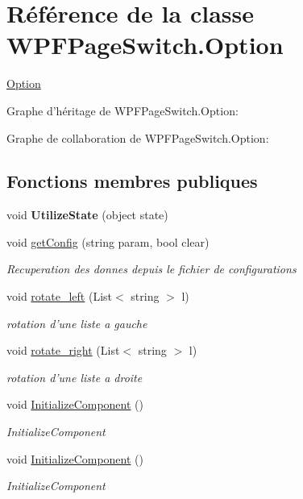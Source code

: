 \hypertarget{class_w_p_f_page_switch_1_1_option}{\section{Référence de la classe W\+P\+F\+Page\+Switch.\+Option}
\label{class_w_p_f_page_switch_1_1_option}
}


\hyperlink{class_w_p_f_page_switch_1_1_option}{Option}  




Graphe d'héritage de W\+P\+F\+Page\+Switch.\+Option\+:


Graphe de collaboration de W\+P\+F\+Page\+Switch.\+Option\+:
\subsection*{Fonctions membres publiques}
\begin{DoxyCompactItemize}
\item 
\hypertarget{class_w_p_f_page_switch_1_1_option_a376be63c0c1be45ecf6a73ea54872524}{void {\bfseries Utilize\+State} (object state)}\label{class_w_p_f_page_switch_1_1_option_a376be63c0c1be45ecf6a73ea54872524}

\item 
void \hyperlink{class_w_p_f_page_switch_1_1_option_ab61070b3c563a16e29550e1ba0d5046b}{get\+Config} (string param, bool clear)
\begin{DoxyCompactList}\small\item\em Recuperation des donnes depuis le fichier de configurations \end{DoxyCompactList}\item 
void \hyperlink{class_w_p_f_page_switch_1_1_option_ab9931ed6a02b7dc83bcd4c7a368e6d07}{rotate\+\_\+left} (List$<$ string $>$ l)
\begin{DoxyCompactList}\small\item\em rotation d'une liste a gauche \end{DoxyCompactList}\item 
void \hyperlink{class_w_p_f_page_switch_1_1_option_a696d785be49fa21a97385cbd884b4bc9}{rotate\+\_\+right} (List$<$ string $>$ l)
\begin{DoxyCompactList}\small\item\em rotation d'une liste a droite \end{DoxyCompactList}\item 
void \hyperlink{class_w_p_f_page_switch_1_1_option_a317fd55293bd6bbd222ccdfbc9e2812f}{Initialize\+Component} ()
\begin{DoxyCompactList}\small\item\em Initialize\+Component \end{DoxyCompactList}\item 
void \hyperlink{class_w_p_f_page_switch_1_1_option_a317fd55293bd6bbd222ccdfbc9e2812f}{Initialize\+Component} ()
\begin{DoxyCompactList}\small\item\em Initialize\+Component \end{DoxyCompactList}\end{DoxyCompactItemize}
